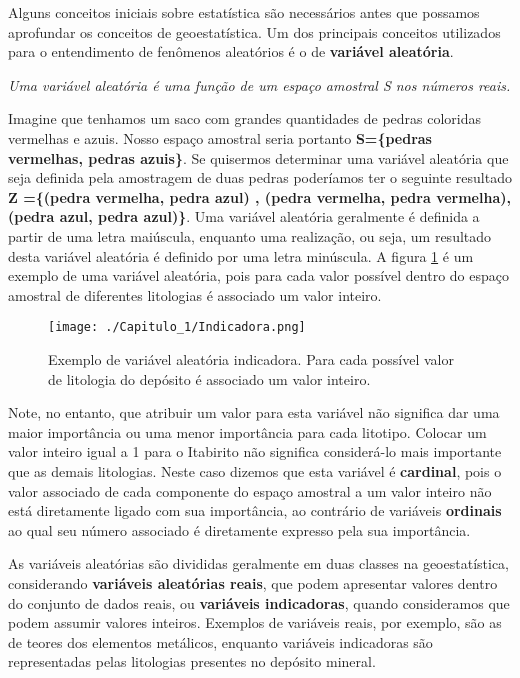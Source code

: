 Alguns conceitos iniciais sobre estatística são necessários antes que possamos aprofundar os conceitos de geoestatística. Um dos principais conceitos utilizados para o entendimento de fenômenos aleatórios é o de \textbf{variável aleatória}. 

\begin{definition} 
	\textit{Uma variável aleatória é uma função de um espaço amostral S nos números reais.} \citet{casella2010inferencia}
\end{definition} 

Imagine que tenhamos um saco com grandes quantidades de pedras coloridas vermelhas e azuis. Nosso espaço amostral seria portanto \textbf{S=\{pedras vermelhas, pedras azuis\}}. Se quisermos determinar uma variável aleatória que seja definida pela amostragem de duas pedras poderíamos ter o seguinte resultado \textbf{Z =\{(pedra vermelha, pedra azul) , (pedra vermelha, pedra vermelha), (pedra azul, pedra azul)\}}. Uma variável aleatória geralmente é definida a partir de uma letra maiúscula, enquanto uma realização, ou seja, um resultado desta variável aleatória é definido por uma letra minúscula. A figura \ref{Indicadora} é um exemplo de uma variável aleatória, pois para cada valor possível dentro do espaço amostral de diferentes litologias é associado um valor inteiro. 

\FloatBarrier
\begin{figure}[!htb]
	\centering
	\texttt{[image: ./Capitulo\_1/Indicadora.png]}	
	\caption{Exemplo de variável aleatória indicadora. Para cada possível valor de litologia do depósito é associado um valor inteiro. }
	\label{Indicadora}
\end{figure}
\FloatBarrier

Note, no entanto, que atribuir um valor para esta variável não significa dar uma maior importância ou uma menor importância para cada litotipo. Colocar um valor inteiro igual a 1 para o Itabirito não significa considerá-lo mais importante que as demais litologias. Neste caso dizemos que esta variável é \textbf{cardinal}, pois o valor associado de cada componente do espaço amostral a um valor inteiro não está diretamente ligado com sua importância, ao contrário de variáveis \textbf{ordinais} ao qual seu número associado é diretamente expresso pela sua importância.

 As variáveis aleatórias são divididas geralmente em duas classes na geoestatística, considerando \textbf{variáveis aleatórias reais}, que podem apresentar valores dentro do conjunto de dados reais, ou \textbf{variáveis indicadoras}, quando consideramos que podem assumir valores inteiros. Exemplos de variáveis reais, por exemplo, são as de teores dos elementos metálicos, enquanto variáveis indicadoras são representadas pelas litologias presentes no depósito mineral. 
 
